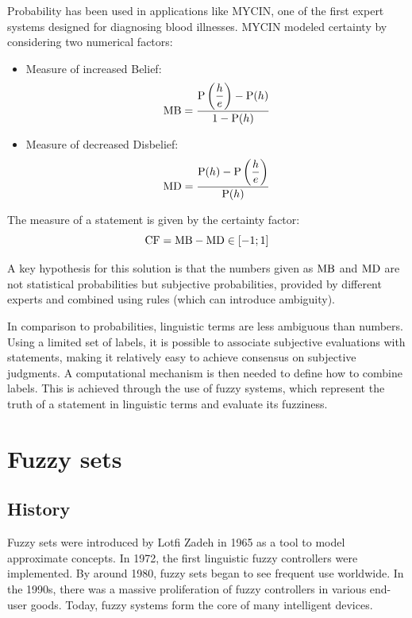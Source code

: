 \documentclass[12pt, a4paper]{report}
\begin{document}
    Probability has been used in applications like MYCIN, one of the first expert systems designed for diagnosing blood illnesses. 
    MYCIN modeled certainty by considering two numerical factors:
    \begin{itemize}
        \item Measure of increased Belief: 
            \[\textnormal{MB}=\dfrac{\textnormal{P}\left(\dfrac{h}{e}\right)-\textnormal{P}(h)}{1-\textnormal{P}(h)}\]
        \item Measure of decreased Disbelief: 
            \[\textnormal{MD}=\dfrac{\textnormal{P}(h)-\textnormal{P}\left(\dfrac{h}{e}\right)}{\textnormal{P}(h)}\]
    \end{itemize}
    The measure of a statement is given by the certainty factor:
    \[\textnormal{CF}=\textnormal{MB}-\textnormal{MD} \in [-1;1]\]
    
    A key hypothesis for this solution is that the numbers given as $\textnormal{MB}$ and $\textnormal{MD}$ are not statistical probabilities but subjective probabilities, provided by different experts and combined using rules (which can introduce ambiguity).
    
    In comparison to probabilities, linguistic terms are less ambiguous than numbers. 
    Using a limited set of labels, it is possible to associate subjective evaluations with statements, making it relatively easy to achieve consensus on subjective judgments. 
    A computational mechanism is then needed to define how to combine labels. 
    This is achieved through the use of fuzzy systems, which represent the truth of a statement in linguistic terms and evaluate its fuzziness.
    
    \newpage

    \chapter{Fuzzy sets}
    \section{History}
    Fuzzy sets were introduced by Lotfi Zadeh in 1965 as a tool to model approximate concepts. 
    In 1972, the first linguistic fuzzy controllers were implemented. 
    By around 1980, fuzzy sets began to see frequent use worldwide. 
    In the 1990s, there was a massive proliferation of fuzzy controllers in various end-user goods. 
    Today, fuzzy systems form the core of many intelligent devices.
\end{document}

